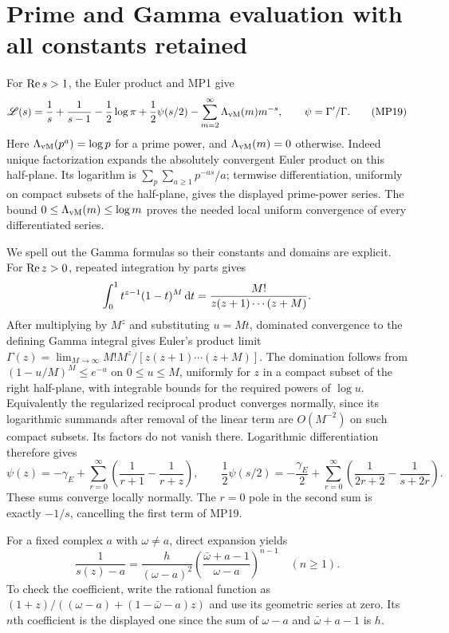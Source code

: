 \section{Prime and Gamma evaluation with all constants retained}
For $\operatorname{Re} s>1$, the Euler product and MP1 give
\begin{equation}
 \mathscr L(s)=\frac1s+\frac1{s-1}-\frac12\log\pi
           +\frac12\psi(s/2)-\sum_{m=2}^\infty\Lambda_{\mathrm{vM}}(m)m^{-s},
 \qquad \psi=\Gamma'/\Gamma.\tag{MP19}
\end{equation}
Here $\Lambda_{\mathrm{vM}}(p^a)=\log p$ for a prime power, and $\Lambda_{\mathrm{vM}}(m)=0$ otherwise.
Indeed unique factorization expands the absolutely convergent Euler
product on this half-plane. Its logarithm is
$\sum_p\sum_{a\geq1}p^{-as}/a$; termwise differentiation, uniformly
on compact subsets of the half-plane, gives the displayed prime-power
series. The bound $0\leq\Lambda_{\mathrm{vM}}(m)\leq\log m$ proves the needed local
uniform convergence of every differentiated series.

We spell out the Gamma formulas so their constants and domains are
explicit. For $\operatorname{Re} z>0$, repeated integration by parts gives
\[
 \int_0^1t^{z-1}(1-t)^M\,\mathrm d t
       =\frac{M!}{z(z+1)\cdots(z+M)}.
\]
After multiplying by $M^z$ and substituting $u=Mt$, dominated
convergence to the defining Gamma integral gives Euler's product limit
$\Gamma(z)=\lim_{M\to\infty}M!M^z/[z(z+1)\cdots(z+M)]$.
The domination follows from $(1-u/M)^M\leq e^{-u}$ on $0\leq u\leq M$,
uniformly for $z$ in a compact subset of the right half-plane, with
integrable bounds for the required powers of $\log u$.
Equivalently the regularized reciprocal product converges normally,
since its logarithmic summands after removal of the linear term are
$O(M^{-2})$ on such compact subsets. Its factors do not vanish there.
Logarithmic differentiation therefore gives
\begin{equation}
 \psi(z)=-\gamma_E+\sum_{r=0}^\infty
                   \left(\frac1{r+1}-\frac1{r+z}\right),
 \qquad
 \frac12\psi(s/2)=-\frac{\gamma_E}2+
       \sum_{r=0}^\infty\left(\frac1{2r+2}-\frac1{s+2r}\right).
 \tag{MP20}
\end{equation}
These sums converge locally normally. The $r=0$ pole in the second
sum is exactly $-1/s$, cancelling the first term of MP19.

For a fixed complex $a$ with $\omega\ne a$, direct expansion yields
\begin{equation}
 [z^n]\frac1{s(z)-a}
 =\frac h{(\omega-a)^2}
       \left(\frac{\bar\omega+a-1}{\omega-a}\right)^{n-1}
 \quad(n\geq1).\tag{MP21}
\end{equation}
To check the coefficient, write the rational function as
$(1+z)/((\omega-a)+(1-\bar\omega-a)z)$ and use its geometric series
at zero. Its $n$th coefficient is the displayed one since the sum of
$\omega-a$ and $\bar\omega+a-1$ is $h$.

